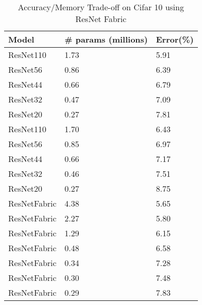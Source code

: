 \begin{table}[]
\centering
\begin{tabular}{|l|l|l|}
\hline
Model               & \# params (millions) & Error(\%) \\ \hline
ResNet110           & 1.73                 & 5.91      \\
ResNet56            & 0.86                 & 6.39      \\
ResNet44            & 0.66                 & 6.79      \\
ResNet32            & 0.47                 & 7.09      \\
ResNet20            & 0.27                 & 7.81      \\ \hline
ResNet110 \cite{DBLP:journals/corr/HeZRS15} & 1.70                 & 6.43      \\
ResNet56  \cite{DBLP:journals/corr/HeZRS15} & 0.85                 & 6.97      \\
ResNet44  \cite{DBLP:journals/corr/HeZRS15} & 0.66                 & 7.17      \\
ResNet32 \cite{DBLP:journals/corr/HeZRS15}  & 0.46                 & 7.51      \\
ResNet20 \cite{DBLP:journals/corr/HeZRS15}  & 0.27                 & 8.75      \\ \hline
ResNetFabric        & 4.38                 & 5.65      \\
ResNetFabric        & 2.27                 & 5.80      \\
ResNetFabric        & 1.29                 & 6.15      \\
ResNetFabric        & 0.48                 & 6.58      \\
ResNetFabric        & 0.34                 & 7.28      \\
ResNetFabric        & 0.30                 & 7.48      \\
ResNetFabric        & 0.29                 & 7.83      \\ \hline
\end{tabular}
\caption{Accuracy/Memory Trade-off on Cifar 10 using ResNet Fabric}
\label{cif10_mem_rnf_tab}
\end{table}
